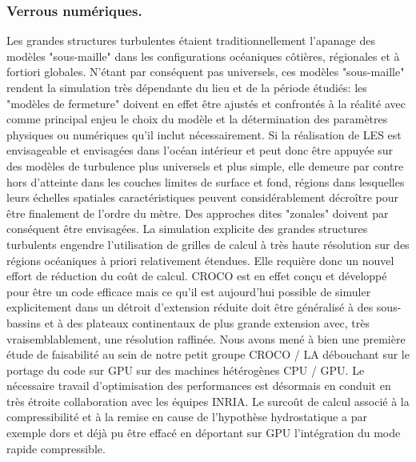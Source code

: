 \subsubsection{Verrous numériques.}
Les grandes structures turbulentes étaient traditionnellement l'apanage des modèles "sous-maille" dans les configurations océaniques côtières, régionales et à fortiori globales. N'étant par conséquent pas universels, ces modèles "sous-maille" rendent la simulation très dépendante du lieu et de la période étudiés: les "modèles de fermeture" doivent en effet être ajustés et confrontés à la réalité avec comme principal enjeu le choix du modèle et la détermination des paramètres physiques ou numériques qu’il inclut nécessairement. Si la réalisation de LES est envisageable et envisagées dans l’océan intérieur et peut donc être appuyée sur des modèles de turbulence plus universels et plus simple, elle demeure par contre hors d’atteinte dans les couches limites de surface et fond, régions dans lesquelles leurs échelles spatiales caractéristiques peuvent considérablement décroître pour être finalement de l'ordre du mètre. Des approches dites "zonales" doivent par conséquent être envisagées.
La simulation explicite des grandes structures turbulents engendre l'utilisation de grilles de calcul à très haute résolution sur des régions océaniques à priori relativement étendues. Elle requière donc un nouvel effort de réduction du coût de calcul. CROCO est en effet conçu et développé pour être un code efficace mais ce qu'il est aujourd'hui possible de simuler explicitement dans un détroit d'extension réduite doit être généralisé à des sous-bassins et à des plateaux continentaux de plus grande extension avec, très vraisemblablement, une résolution raffinée. Nous avons mené à bien une première étude de faisabilité au sein de notre petit groupe CROCO / LA débouchant sur le portage du code sur GPU sur des machines hétérogènes CPU / GPU. Le nécessaire travail d’optimisation des performances est désormais en conduit en très étroite collaboration avec les équipes INRIA. Le surcoût de calcul associé à la compressibilité et à la remise en cause de l'hypothèse hydrostatique a par exemple dors et déjà pu être effacé en déportant sur GPU l'intégration du mode rapide compressible.


\color{black}

